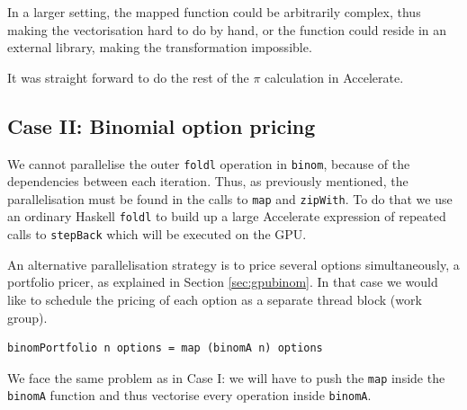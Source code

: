 \documentclass[preprint]{sigplanconf}
\begin{document}
In a larger setting, the mapped function could be arbitrarily complex,
thus making the vectorisation hard to do by hand, or the function could
reside in an external library, making the transformation impossible.

It was straight forward to do the rest of the $\pi$ calculation in
Accelerate.

\subsection{Case II: Binomial option pricing}
We cannot parallelise the outer \verb|foldl| operation in
\verb|binom|, because of the dependencies between each
iteration. Thus, as previously mentioned, the parallelisation must be
found in the calls to \verb|map| and \verb|zipWith|. To do that we use
an ordinary Haskell \verb|foldl| to build up a large Accelerate
expression of repeated calls to \verb|stepBack| which will be executed
on the GPU.

An alternative parallelisation strategy is to price several options
simultaneously, a portfolio pricer, as explained in Section
\ref{sec:gpubinom}. In that case we would like to schedule the pricing
of each option as a separate thread block (work group).


\begin{verbatim}
binomPortfolio n options = map (binomA n) options
\end{verbatim}

We face the same problem as in Case I: we will have to push the
\verb|map| inside the \verb|binomA| function and thus vectorise every
operation inside \verb|binomA|.


\end{document}
